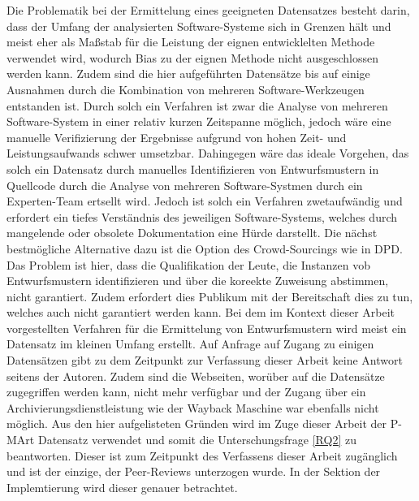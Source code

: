 Die Problematik bei der Ermittelung eines geeigneten Datensatzes besteht darin, dass der Umfang der analysierten Software-Systeme sich in Grenzen hält und meist eher als Maßstab für die Leistung der eignen entwicklelten Methode verwendet wird, wodurch Bias zu der eignen Methode nicht ausgeschlossen werden kann.
Zudem sind die hier aufgeführten Datensätze bis auf einige Ausnahmen durch die Kombination von mehreren Software-Werkzeugen entstanden ist. Durch solch ein Verfahren ist zwar die Analyse von mehreren Software-System in einer relativ kurzen Zeitspanne möglich, jedoch wäre eine manuelle Verifizierung der Ergebnisse aufgrund von hohen Zeit- und Leistungsaufwands schwer umsetzbar.
Dahingegen wäre das ideale Vorgehen, das solch ein Datensatz durch manuelles Identifizieren von Entwurfsmustern in Quellcode durch die Analyse von mehreren Software-Systmen durch ein Experten-Team ertsellt wird. Jedoch ist solch ein Verfahren zwetaufwändig und erfordert ein tiefes Verständnis des jeweiligen Software-Systems, welches durch mangelende oder obsolete Dokumentation eine Hürde darstellt.
Die nächst bestmögliche Alternative dazu ist die Option des Crowd-Sourcings wie in DPD. Das Problem ist hier, dass die Qualifikation der Leute, die Instanzen vob Entwurfsmustern identifizieren und über die koreekte Zuweisung abstimmen, nicht garantiert. Zudem erfordert dies Publikum mit der Bereitschaft dies zu tun, welches auch nicht garantiert werden kann.
Bei dem im Kontext dieser Arbeit vorgestellten Verfahren für die Ermittelung von Entwurfsmustern wird meist ein Datensatz im kleinen Umfang erstellt. Auf Anfrage auf Zugang zu einigen Datensätzen gibt zu dem Zeitpunkt zur Verfassung dieser Arbeit keine Antwort seitens der Autoren. Zudem sind die Webseiten, worüber auf die Datensätze zugegriffen werden kann, nicht mehr verfügbar und der Zugang über ein Archivierungsdienstleistung wie der Wayback Maschine war ebenfalls nicht möglich. 
Aus den hier aufgelisteten Gründen wird im Zuge dieser Arbeit der P-MArt Datensatz verwendet und somit die Unterschungsfrage \ref{RQ2} zu beantworten. Dieser ist zum Zeitpunkt des Verfassens dieser Arbeit zugänglich und ist der einzige, der Peer-Reviews unterzogen wurde. In der Sektion der Implemtierung wird dieser genauer betrachtet.
